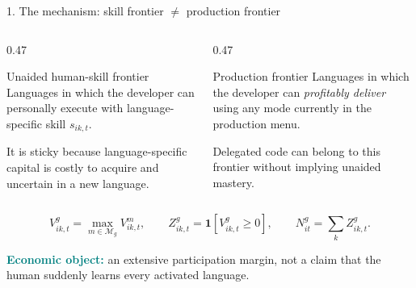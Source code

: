 \documentclass[aspectratio=169,10pt]{beamer}
\newcommand{\strong}[1]{\textcolor{Teal}{\textbf{#1}}}
\begin{document}
\begin{frame}{1. The mechanism: skill frontier $\neq$ production frontier}
  \vspace{-0.08cm}
  \begin{columns}[T,onlytextwidth]
    \begin{column}{0.47\textwidth}
      \begin{block}{Unaided human-skill frontier}
        Languages in which the developer can personally execute with language-specific skill $s_{ik,t}$.

        \medskip
        It is sticky because language-specific capital is costly to acquire and uncertain in a new language.
      \end{block}
    \end{column}
    \begin{column}{0.47\textwidth}
      \begin{exampleblock}{Production frontier}
        Languages in which the developer can \emph{profitably deliver} using any mode currently in the production menu.

        \medskip
        Delegated code can belong to this frontier without implying unaided mastery.
      \end{exampleblock}
    \end{column}
  \end{columns}

  \vspace{0.20cm}
  \[
    V^{g}_{ik,t}=\max_{m\in\mathcal M_g}V^m_{ik,t},
    \qquad
    Z^{g}_{ik,t}=\mathbf 1\!\left[V^{g}_{ik,t}\ge 0\right],
    \qquad
    N^g_{it}=\sum_k Z^g_{ik,t}.
  \]

  \begin{center}
    \strong{Economic object:} an extensive participation margin, not a claim that the human suddenly learns every activated language.
  \end{center}
\end{frame}
\end{document}
